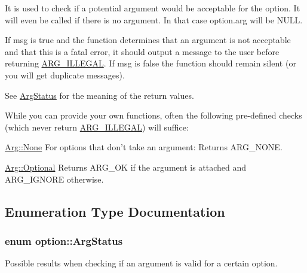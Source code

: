 \-It is used to check if a potential argument would be acceptable for the option. \-It will even be called if there is no argument. \-In that case {\ttfamily option.\-arg} will be {\ttfamily \-N\-U\-L\-L}.

\-If {\ttfamily msg} is {\ttfamily true} and the function determines that an argument is not acceptable and that this is a fatal error, it should output a message to the user before returning \hyperlink{namespaceoption_aee8c76a07877335762631491e7a5a1a9a9528e32563b795bd2930b12d0a5e382d}{\-A\-R\-G\-\_\-\-I\-L\-L\-E\-G\-A\-L}. \-If {\ttfamily msg} is {\ttfamily false} the function should remain silent (or you will get duplicate messages).

\-See \hyperlink{namespaceoption_aee8c76a07877335762631491e7a5a1a9}{\-Arg\-Status} for the meaning of the return values.

\-While you can provide your own functions, often the following pre-\/defined checks (which never return \hyperlink{namespaceoption_aee8c76a07877335762631491e7a5a1a9a9528e32563b795bd2930b12d0a5e382d}{\-A\-R\-G\-\_\-\-I\-L\-L\-E\-G\-A\-L}) will suffice\-:

\begin{DoxyItemize}
\item {\ttfamily \hyperlink{structoption_1_1_arg_a7fc01987899c91c6b6a1be5711a46e22}{\-Arg\-::\-None}} \-For options that don't take an argument\-: \-Returns \-A\-R\-G\-\_\-\-N\-O\-N\-E.  \item {\ttfamily \hyperlink{structoption_1_1_arg_aadb5316ecbc9eb0a7f0019d14bf35ad0}{\-Arg\-::\-Optional}} \-Returns \-A\-R\-G\-\_\-\-O\-K if the argument is attached and \-A\-R\-G\-\_\-\-I\-G\-N\-O\-R\-E otherwise.  \end{DoxyItemize}


\subsection{\-Enumeration \-Type \-Documentation}
\hypertarget{namespaceoption_aee8c76a07877335762631491e7a5a1a9}{
\subsubsection[{\-Arg\-Status}]{\setlength{\rightskip}{0pt plus 5cm}enum {\bf option\-::\-Arg\-Status}}}\label{namespaceoption_aee8c76a07877335762631491e7a5a1a9}


\-Possible results when checking if an argument is valid for a certain option. 

